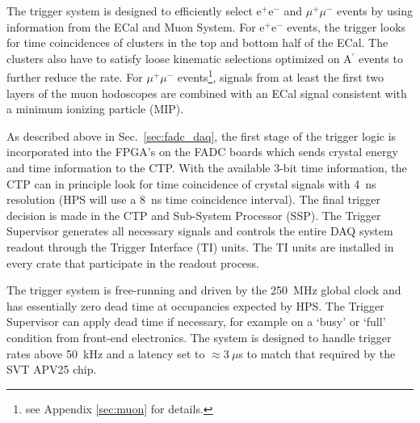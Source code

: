 

The trigger system is designed to efficiently select e$^{+}$e$^{-}$ and $\mu^{+}\mu^{-}$ events by 
using information from the ECal and Muon System. For e$^{+}$e$^{-}$ events, the trigger looks for time coincidences of clusters in the top and bottom half of the ECal. The clusters also have to satisfy loose kinematic selections optimized on A$^{\prime}$ events to further reduce the rate. 
For $\mu^{+}\mu^{-}$ events\footnote{see Appendix \ref{sec:muon} for details.}, signals from at least the first two layers of the muon hodoscopes are combined with an ECal signal consistent with a minimum ionizing particle (MIP).

As described above in Sec.~\ref{sec:fadc_daq}, the first stage of the trigger logic is incorporated into the FPGA's on the FADC boards which sends crystal energy and time information to the CTP. With the available 3-bit time information, the CTP can in principle look for time coincidence of crystal signals with 4~ns resolution (HPS will use a 8~ns time coincidence interval). The final trigger decision is made in the CTP and Sub-System Processor (SSP). The Trigger Supervisor generates all necessary signals and controls the entire DAQ system readout through the Trigger Interface (TI) units. The TI units are installed in every crate that participate in the readout process. 

The trigger system is free-running and driven by the 250~MHz global clock and has essentially zero dead time at occupancies expected by HPS. The Trigger Supervisor can apply dead time if necessary, for example on a `busy' or `full' condition from front-end electronics. The system is designed to handle trigger rates above 50~kHz and a latency set to $\approx 3~\mu$s to match that required by the SVT APV25 chip. 


 




